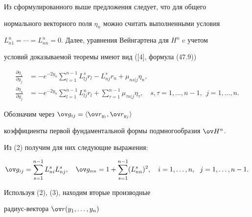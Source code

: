 \begin{pf}


Из сформулированного выше предложения следует, что для общего 


нормального векторного поля $\eta_n$ можно считать выполненными условия 


$L^n_{n1}=\dotsb=L^n_{nn}=0$. Далее, уравнения Вейнгартена для $H^n$ c учетом 


условий доказываемой теоремы имеют вид ([4], формула (47.9))


\begin{equation}


\begin{split}


\frac{ \partial \eta_s}{\partial y_j}&=-e^{-2y_n}\sum^{n-1}_{l=1}L^s_{lj}r_l


-L^s_{nj}r_n+\mu_{ns|j}\eta_n,\\


%


\frac{\partial \eta_n}{\partial y_j}&=-e^{-2y_n}\sum_{l=1}^{n-1}L^n_{lj}r_l


+\sum_{\tau =1}^{n-1}\mu_{\tau n|j}\eta_\tau,\quad


s,\tau=1,\dotsc,n-1,\ \ j=1,\dotsc,n.


\end{split}


\end{equation}





Обозначим через $\ov g_{ij}=\la \ov r_{y_i},\ov r_{y_j}\ra$ 


коэффициенты первой фундаментальной формы подмногообразия $\ov H{}^n$. 


Из (2) получим для них следующие выражения: 


\begin{equation}


\ov g_{ij}=\sum^{n-1}_{s=1}L^s_{ni}L^s_{nj},\quad


\ov g_{nn}=1+\sum^{n-1}_{s=1}(L^s_{nn})^2,


\quad i=1,\dotsc,n,\ \ j=1,\dotsc,n-1.


\end{equation}





Используя (2), (3), находим вторые производные 


радиус-вектора $\ov r(y_1,\dotsc,y_n)$


\begin{equation}



\end{equation}
\end{pf}
